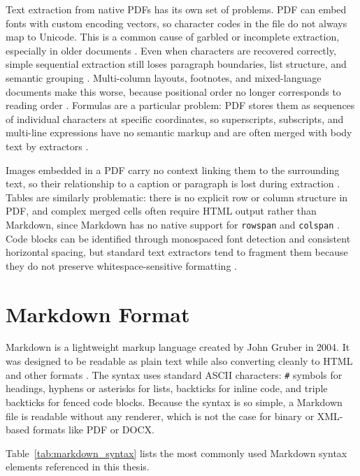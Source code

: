 Text extraction from native PDFs has its own set of problems. PDF can embed
fonts with custom encoding vectors, so character codes in the file do not
always map to Unicode. This is a common cause of garbled or incomplete
extraction, especially in older documents \autocite{whitington2012}. Even when
characters are recovered correctly, simple sequential extraction still loses
paragraph boundaries, list structure, and semantic grouping
\autocite{meuschke2023}. Multi-column layouts, footnotes, and mixed-language
documents make this worse, because positional order no longer corresponds to
reading order \autocite{gao2011}. Formulas are a particular problem: PDF stores
them as sequences of individual characters at specific coordinates, so
superscripts, subscripts, and multi-line expressions have no semantic markup
and are often merged with body text by extractors \autocite{blecher2023}.

Images embedded in a PDF carry no context linking them to the surrounding text,
so their relationship to a caption or paragraph is lost during extraction
\autocite{gao2011}. Tables are similarly problematic: there is no explicit row
or column structure in PDF, and complex merged cells often require HTML output
rather than Markdown, since Markdown has no native support for \texttt{rowspan}
and \texttt{colspan} \autocite{zhu2022}. Code blocks can be identified through
monospaced font detection and consistent horizontal spacing, but standard text
extractors tend to fragment them because they do not preserve
whitespace-sensitive formatting \autocite{meuschke2023}.

\section{Markdown Format}

Markdown is a lightweight markup language created by John Gruber in 2004. It
was designed to be readable as plain text while also converting cleanly to HTML
and other formats \autocite{cone2019}. The syntax uses standard ASCII characters:
\texttt{\#} symbols for headings, hyphens or asterisks for lists, backticks for
inline code, and triple backticks for fenced code blocks. Because the syntax is
so simple, a Markdown file is readable without any renderer, which is not the
case for binary or XML-based formats like PDF or DOCX.

Table~\ref{tab:markdown_syntax} lists the most commonly used Markdown syntax
elements referenced in this thesis.

